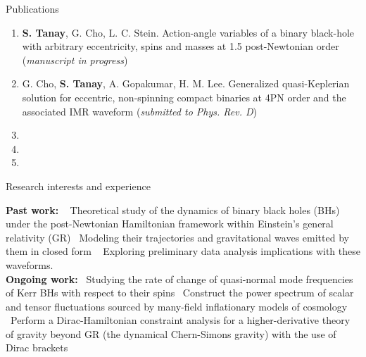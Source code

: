 \documentclass{resume} %
\begin{document}



\begin{rSection}{Publications}
  \begin{enumerate}
  	\item \textbf{S. Tanay}, G. Cho, L. C. Stein. Action-angle variables of a binary black-hole with arbitrary eccentricity, spins and
masses at 1.5 post-Newtonian order (\textit{manuscript in progress})
  	\item G. Cho, \textbf{S. Tanay}, A. Gopakumar, H. M. Lee. Generalized quasi-Keplerian solution for eccentric, non-spinning compact binaries at
4PN order and the associated IMR waveform (\textit{submitted to Phys. Rev. D})
    \item {}
    \item {}
    \item {}
  \end{enumerate}
  \end{rSection}



 

\begin{rSection}{Research interests and experience}

\textbf{Past work:} \textbullet ~ Theoretical study of the dynamics of binary black holes (BHs) under the post-Newtonian Hamiltonian framework within
Einstein's general relativity (GR) \textbullet ~Modeling their trajectories and gravitational waves emitted by them in closed form \textbullet ~ Exploring
preliminary data analysis implications with these waveforms. \\
\textbf{Ongoing work:} \textbullet ~Studying the rate of change of quasi-normal mode frequencies of Kerr BHs with respect to their spins
 \textbullet ~Construct the power spectrum of scalar and tensor fluctuations sourced by many-field inflationary models of cosmology
 \textbullet ~Perform a Dirac-Hamiltonian constraint analysis for a higher-derivative theory of gravity beyond GR (the dynamical Chern-Simons gravity)
with the use of Dirac brackets

\end{rSection} 
  
\end{document}

